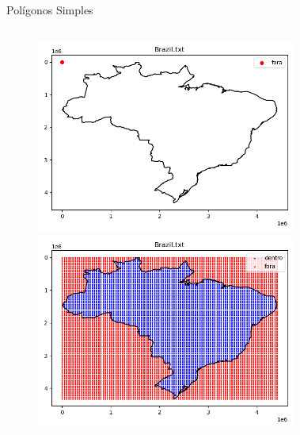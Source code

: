 \documentclass[aspectratio=169,usenames,dvipsnames]{beamer}
\begin{document}
\begin{frame}{Polígonos Simples}
\begin{columns}
\begin{center}
      \begin{figure}
        \begin{overprint}
        \includegraphics[width=1.0\textwidth]{figures/Brazil.png}
        \includegraphics[width=1.0\textwidth]{figures/Brazil_grid.png}
        \end{overprint}
      \end{figure}
    \end{center}
    \begin{center}
      \begin{figure}
        \begin{overprint}

\end{overprint}
\end{figure}
\end{center}
\end{columns}
\end{frame}
\end{document}
